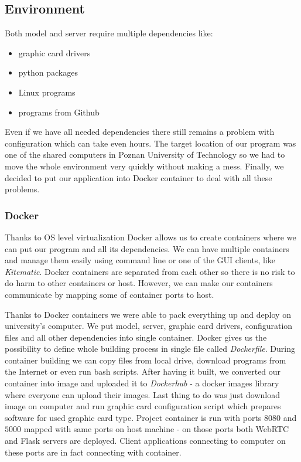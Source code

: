\documentclass[../Main.tex]{subfiles}
\begin{document}
\subsection{Environment}
    Both model and server require multiple dependencies like:
    \begin{itemize}
        \item graphic card drivers
        \item python packages 
        \item Linux programs
        \item programs from Github
    \end{itemize}
    Even if we have all needed dependencies there still remains a problem with configuration which can take even hours. The target location of our program was one of the shared computers in Poznan University of Technology so we had to move the whole environment very quickly without making a mess. 
    Finally, we decided to put our application into Docker container to deal with all these problems.
    
    \subsubsection{Docker}
    Thanks to OS level virtualization Docker allows us to create containers where we can put our program and all its dependencies. We can have multiple containers and manage them easily using command line or one of the GUI clients, like \textit{Kitematic}. Docker containers are separated from each other so there is no risk to do harm to other containers or host. However, we can make our containers communicate by mapping some of container ports to host.
    
    Thanks to Docker containers we were able to pack everything up and deploy on university's computer.
    We put model, server, graphic card drivers, configuration files and all other dependencies into single container. Docker gives us the possibility to define whole building process in single file called \textit{Dockerfile}. During container building we can copy files from local drive, download programs from the Internet or even run bash scripts. 
    After having it built, we converted our container into image and uploaded it to \textit{Dockerhub} - a docker images library where everyone can upload their images. Last thing to do was just download image on computer and run graphic card configuration script which prepares software for used graphic card type.
    Project container is run with ports $8080$ and $5000$ mapped with same ports on host machine - on those ports both WebRTC and Flask servers are deployed. Client applications connecting to computer on these ports are in fact connecting with container.
\end{document}
